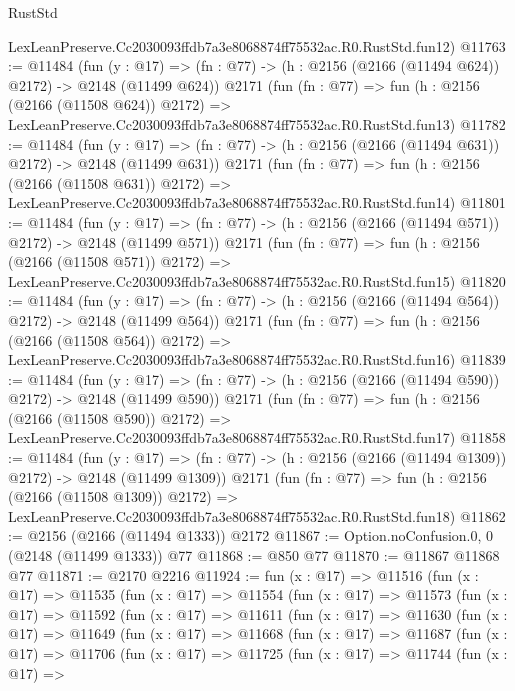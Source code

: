 \begin{lexlean}{RustStd}
\begin{coremodule}
    LexLeanPreserve.Cc2030093ffdb7a3e8068874ff75532ac.R0.RustStd.fun12)
@11763 := @11484
    (fun (y : @17) => (fn : @77) -> (h : @2156 (@2166 (@11494 @624)) @2172) -> @2148 (@11499 @624))
    @2171
    (fun (fn : @77) =>
    fun (h : @2156 (@2166 (@11508 @624)) @2172) =>
    LexLeanPreserve.Cc2030093ffdb7a3e8068874ff75532ac.R0.RustStd.fun13)
@11782 := @11484
    (fun (y : @17) => (fn : @77) -> (h : @2156 (@2166 (@11494 @631)) @2172) -> @2148 (@11499 @631))
    @2171
    (fun (fn : @77) =>
    fun (h : @2156 (@2166 (@11508 @631)) @2172) =>
    LexLeanPreserve.Cc2030093ffdb7a3e8068874ff75532ac.R0.RustStd.fun14)
@11801 := @11484
    (fun (y : @17) => (fn : @77) -> (h : @2156 (@2166 (@11494 @571)) @2172) -> @2148 (@11499 @571))
    @2171
    (fun (fn : @77) =>
    fun (h : @2156 (@2166 (@11508 @571)) @2172) =>
    LexLeanPreserve.Cc2030093ffdb7a3e8068874ff75532ac.R0.RustStd.fun15)
@11820 := @11484
    (fun (y : @17) => (fn : @77) -> (h : @2156 (@2166 (@11494 @564)) @2172) -> @2148 (@11499 @564))
    @2171
    (fun (fn : @77) =>
    fun (h : @2156 (@2166 (@11508 @564)) @2172) =>
    LexLeanPreserve.Cc2030093ffdb7a3e8068874ff75532ac.R0.RustStd.fun16)
@11839 := @11484
    (fun (y : @17) => (fn : @77) -> (h : @2156 (@2166 (@11494 @590)) @2172) -> @2148 (@11499 @590))
    @2171
    (fun (fn : @77) =>
    fun (h : @2156 (@2166 (@11508 @590)) @2172) =>
    LexLeanPreserve.Cc2030093ffdb7a3e8068874ff75532ac.R0.RustStd.fun17)
@11858 := @11484
    (fun (y : @17) =>
    (fn : @77) -> (h : @2156 (@2166 (@11494 @1309)) @2172) -> @2148 (@11499 @1309))
    @2171
    (fun (fn : @77) =>
    fun (h : @2156 (@2166 (@11508 @1309)) @2172) =>
    LexLeanPreserve.Cc2030093ffdb7a3e8068874ff75532ac.R0.RustStd.fun18)
@11862 := @2156 (@2166 (@11494 @1333)) @2172
@11867 := Option.noConfusion.{0, 0} (@2148 (@11499 @1333)) @77
@11868 := @850 @77
@11870 := @11867 @11868 @77
@11871 := @2170 @2216
@11924 := fun (x : @17) =>
  @11516
    (fun (x : @17) =>
    @11535
      (fun (x : @17) =>
      @11554
        (fun (x : @17) =>
        @11573
          (fun (x : @17) =>
          @11592
            (fun (x : @17) =>
            @11611
              (fun (x : @17) =>
              @11630
                (fun (x : @17) =>
                @11649
                  (fun (x : @17) =>
                  @11668
                    (fun (x : @17) =>
                    @11687
                      (fun (x : @17) =>
                      @11706
                        (fun (x : @17) =>
                        @11725
                          (fun (x : @17) =>
                          @11744
                            (fun (x : @17) =>

\end{coremodule}
\end{lexlean}
